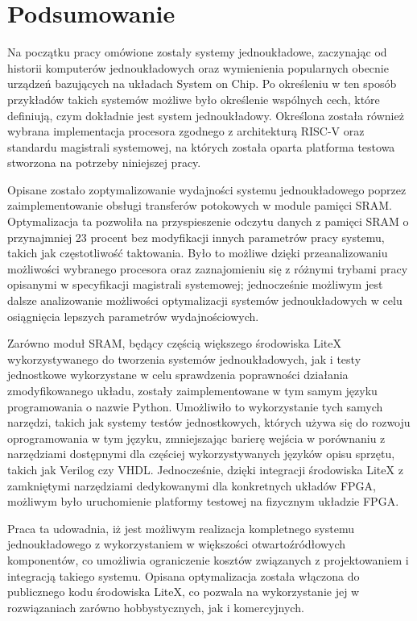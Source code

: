 \section{Podsumowanie}

Na początku pracy omówione zostały systemy jednoukładowe, zaczynając od historii komputerów jednoukładowych oraz wymienienia popularnych obecnie urządzeń bazujących na układach System on Chip. Po określeniu w ten sposób przykładów takich systemów możliwe było określenie wspólnych cech, które definiują, czym dokładnie jest system jednoukładowy. Określona została również wybrana implementacja procesora zgodnego z architekturą RISC-V oraz standardu magistrali systemowej, na których została oparta platforma testowa stworzona na potrzeby niniejszej pracy.

Opisane zostało zoptymalizowanie wydajności systemu jednoukładowego poprzez zaimplementowanie obsługi transferów potokowych w module pamięci SRAM. Optymalizacja ta pozwoliła na przyspieszenie odczytu danych z pamięci SRAM o przynajmniej 23 procent bez modyfikacji innych parametrów pracy systemu, takich jak częstotliwość taktowania. Było to możliwe dzięki przeanalizowaniu możliwości wybranego procesora oraz zaznajomieniu się z różnymi trybami pracy opisanymi w specyfikacji magistrali systemowej; jednocześnie możliwym jest dalsze analizowanie możliwości optymalizacji systemów jednoukładowych w celu osiągnięcia lepszych parametrów wydajnościowych.

Zarówno moduł SRAM, będący częścią większego środowiska LiteX wykorzystywanego do tworzenia systemów jednoukładowych, jak i testy jednostkowe wykorzystane w celu sprawdzenia poprawności działania zmodyfikowanego układu, zostały zaimplementowane w tym samym języku programowania o nazwie Python. Umożliwiło to wykorzystanie tych samych narzędzi, takich jak systemy testów jednostkowych, których używa się do rozwoju oprogramowania w tym języku, zmniejszając barierę wejścia w porównaniu z narzędziami dostępnymi dla częściej wykorzystywanych języków opisu sprzętu, takich jak Verilog czy VHDL. Jednocześnie, dzięki integracji środowiska LiteX z zamkniętymi narzędziami dedykowanymi dla konkretnych układów FPGA, możliwym było uruchomienie platformy testowej na fizycznym układzie FPGA.

Praca ta udowadnia, iż jest możliwym realizacja kompletnego systemu jednoukładowego z wykorzystaniem w większości otwartoźródłowych komponentów, co umożliwia ograniczenie kosztów związanych z projektowaniem i integracją takiego systemu. Opisana optymalizacja została włączona do publicznego kodu środowiska LiteX, co pozwala na wykorzystanie jej w rozwiązaniach zarówno hobbystycznych, jak i komercyjnych.
